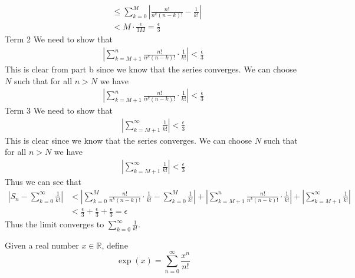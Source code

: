 \documentclass[answers,12pt,addpoints]{exam}
\begin{document}
\begin{questions}
\begin{parts}
\begin{solution}
\begin{align*}
                    &\leq \sum_{k=0}^{M} \left|\frac{n!}{n^k (n-k)!} - \frac{1}{k!}\right| \\
                    &< M \cdot \frac{\epsilon}{3M} = \frac{\epsilon}{3}
                \end{align*}
                Term 2
                We need to show that 
                \begin{align*}
                    |\sum_{k=M+1}^{n} \frac{n!}{n^k (n-k)!} \cdot \frac{1}{k!}| < \frac{\epsilon}{3}
                \end{align*}
                This is clear from part b since we know that the series converges. We can choose $N$ such that for all $n > N$ we have
                \begin{align*}
                    |\sum_{k=M+1}^{n} \frac{n!}{n^k (n-k)!} \cdot \frac{1}{k!}| < \frac{\epsilon}{3}
                \end{align*}
                Term 3
                We need to show that
                \begin{align*}
                    |\sum_{k=M+1}^{\infty} \frac{1}{k!}| < \frac{\epsilon}{3}
                \end{align*}
                This is clear since we know that the series converges. We can choose $N$ such that for all $n > N$ we have
                \begin{align*}
                    |\sum_{k=M+1}^{\infty} \frac{1}{k!}| < \frac{\epsilon}{3}
                \end{align*}
                Thus we can see that 
                \begin{align*}
                    |S_n - \sum_{k=0}^{\infty} \frac{1}{k!}| &< |\sum_{k=0}^{M} \frac{n!}{n^k (n-k)!} \cdot \frac{1}{k!} - \sum_{k=0}^{M} \frac{1}{k!}| + |\sum_{k=M+1}^{n} \frac{n!}{n^k (n-k)!} \cdot \frac{1}{k!}| + |\sum_{k=M+1}^{\infty} \frac{1}{k!}|\\
                    &< \frac{\epsilon}{3} + \frac{\epsilon}{3} + \frac{\epsilon}{3} = \epsilon
                \end{align*}
                Thus the limit converges to $\sum_{k=0}^{\infty} \frac{1}{k!}$.
            \end{solution}
        \end{parts}

        \question Given a real number \(x \in \mathbb{R}\), define
        \[
        \exp(x) = \sum_{n=0}^{\infty} \frac{x^n}{n!}
        \]
        \begin{parts}

\end{parts}
\end{questions}
\end{document}
